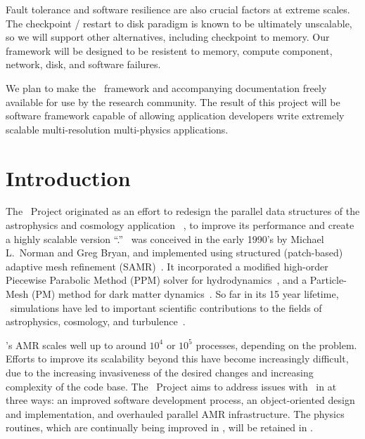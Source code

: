 \documentclass[10pt,twocolumn]{article}
\begin{document}
 Fault tolerance and software
resilience are also crucial factors at extreme scales.  The checkpoint
/ restart to disk paradigm is known to be ultimately unscalable, so we
will support other alternatives, including checkpoint to memory.  Our
framework will be designed to be resistent to memory, compute
component, network, disk, and software failures.

%
We plan to make the \cello\ framework and accompanying documentation
freely available for use by the research community.  The result of
this project will be software framework capable of allowing
application developers write extremely scalable multi-resolution
multi-physics applications.

\section{Introduction} \label{s:intro}


The \cello\ Project originated as an effort to redesign the parallel
data structures of the astrophysics and cosmology application
\enzo~\cite{OsBr04}, to improve its performance and create a highly
scalable version ``\enzoii.''  \enzo\ was conceived in the early 1990's by
Michael L.~Norman and Greg Bryan, and implemented using structured
(patch-based) adaptive mesh refinement (SAMR)~\cite{BeCo89}.  It
incorporated a modified high-order Piecewise Parabolic Method (PPM)
solver for hydrodynamics~\cite{WoCo84b}, and a Particle-Mesh (PM)
method for dark matter dynamics~\cite{@@@PM}.  So far in its 15 year
lifetime, \enzo\ simulations have led to important scientific
contributions to the fields of astrophysics, cosmology, and
turbulence~\cite{@@@enzo-science}.

\enzo's AMR scales well up to around $10^4$ or $10^5$ processes,
depending on the problem.  Efforts to improve its scalability beyond
this have become increasingly difficult, due to the increasing
invasiveness of the desired changes and increasing complexity of the
code base.  The \cello\ Project aims to address issues with \enzo\ in
at three ways: an improved software development process, an
object-oriented design and implementation, and overhauled parallel AMR
infrastructure.  The physics routines, which are continually being
improved in \enzo, will be retained in \enzoii.
\end{document}
